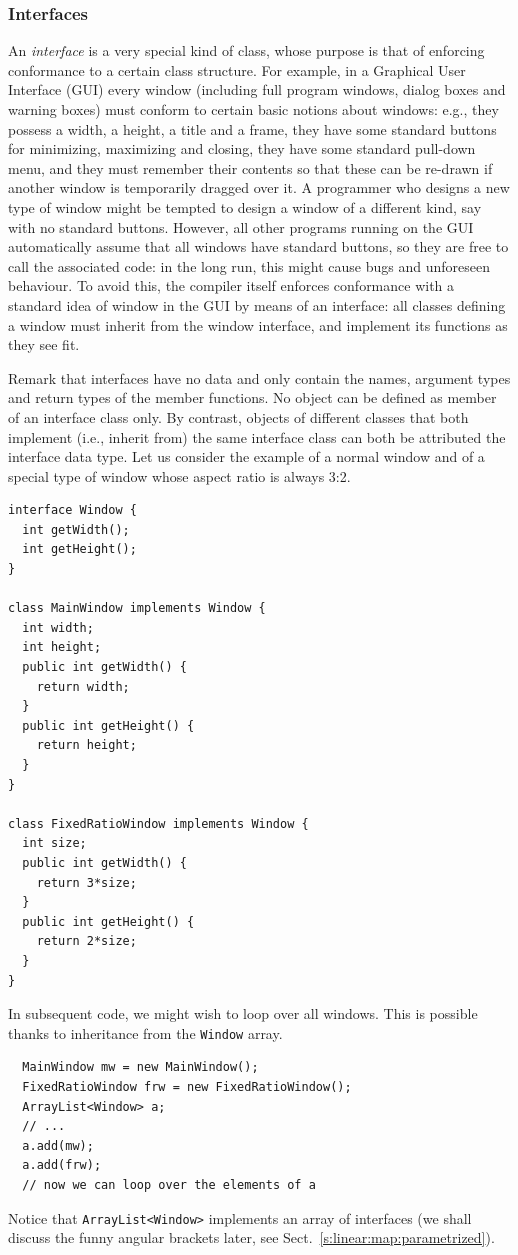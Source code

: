 \documentclass[a4paper]{book}
\theoremstyle{changebreak}                %
\begin{document}
\subsubsection{Interfaces}
\label{s:java:interface}
An {\it interface} is a very
special kind of class, whose purpose is that of enforcing
conformance to a certain class
structure. For example, in a Graphical User
Interface (GUI) every window (including full program
windows, dialog boxes and warning boxes) must conform to certain basic
notions about windows: e.g., they possess a width, a height, a title
and a frame, they have some standard buttons for minimizing,
maximizing and closing, they have some standard pull-down menu, and
they must remember their contents so that these can be re-drawn if
another window is temporarily dragged over it. A programmer who
designs a new type of window might be tempted to design a window of a
different kind, say with no standard buttons. However, all other
programs running on the GUI automatically assume that all windows have
standard buttons, so they are free to call the associated code: in the
long run, this might cause bugs and unforeseen behaviour. To avoid
this, the compiler itself enforces conformance with a standard idea of
window in the GUI by means of an interface: all classes defining a
window must inherit from the window interface, and implement its
functions as they see fit.

Remark that interfaces have no data and only contain the names,
argument types and return types of the member functions. No object can
be defined as member of an interface class
only. By contrast, objects of different
classes that both implement (i.e.,
inherit from) the same interface class can both be attributed the
interface data type. Let us consider the example of a normal window
and of a special type of window whose aspect ratio is always 3:2.
\begin{verbatim}
interface Window {
  int getWidth();
  int getHeight();
}

class MainWindow implements Window {
  int width;
  int height;
  public int getWidth() {
    return width;
  }
  public int getHeight() {
    return height;
  }
}

class FixedRatioWindow implements Window {
  int size;
  public int getWidth() {
    return 3*size;
  }
  public int getHeight() {
    return 2*size;
  }
}
\end{verbatim}
In subsequent code, we might wish to loop over all windows. This is
possible thanks to inheritance from the {\tt Window} array.
\begin{verbatim}
  MainWindow mw = new MainWindow();
  FixedRatioWindow frw = new FixedRatioWindow();
  ArrayList<Window> a;
  // ...
  a.add(mw);
  a.add(frw);
  // now we can loop over the elements of a
\end{verbatim}
Notice that {\tt ArrayList<Window>}
implements an array of interfaces (we shall discuss the funny angular
brackets later, see Sect.~\ref{s:linear:map:parametrized}).
\end{document}
